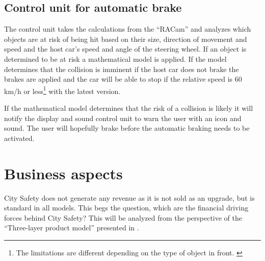 \documentclass[conference]{IEEEtran}
\begin{document}
\subsection{Control unit for automatic brake}
The control unit takes the calculations from the ``RACam'' and analyzes which objects are at risk of being hit based on their size, direction of movement and speed and the host car's speed and angle of the steering wheel. If an object is determined to be at risk a mathematical model is applied. If the model determines that the collision is imminent if the host car does not brake the brakes are applied and the car will be able to stop if the relative speed is 60 km/h or less\footnote{The limitations are different depending on the type of object in front. \cite{CitySafetyDefinition}} with the latest version. \cite{SysDescription, CitySafetyDefinition}

If the mathematical model determines that the risk of a collision is likely it will notify the display and sound control unit to warn the user with an icon and sound. The user will hopefully brake before the automatic braking needs to be activated. \cite{CitySafetyDefinition}


\section{Business aspects}
City Safety does not generate any revenue as it is not sold as an upgrade, but is standard in all models. This begs the question, which are the financial driving forces behind City Safety? This will be analyzed from the perspective of the ``Three-layer product model'' presented in \cite{TeLESM}.
\end{document}
